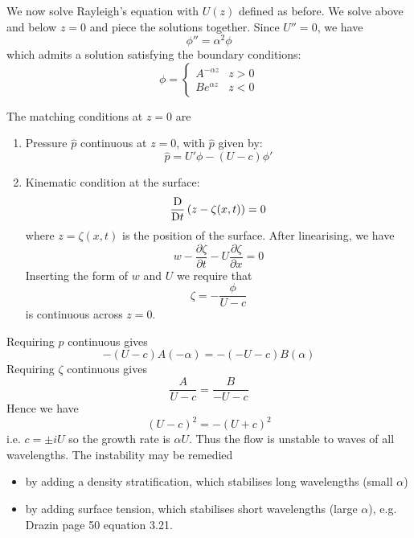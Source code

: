 \documentclass{jknotes}
\begin{document}
We now solve Rayleigh's equation with $U(z)$ defined as before. We solve above
and below $z=0$ and piece the solutions together. Since $U'' = 0$, we have
\begin{equation}
	\phi'' = \alpha^2 \phi
\end{equation}
which admits a solution satisfying the boundary conditions:
\begin{equation}
	\phi = \begin{cases} A^{-\alpha z} & z > 0 \\ B e^{\alpha z} & z < 0 
	\end{cases}
\end{equation}

The matching conditions at $z=0$ are
\begin{enumerate}
	\item Pressure $\hat{p}$ continuous at $z=0$, with $\hat{p}$ given by:
		\begin{equation}
			\hat{p} = U' \phi - (U-c) \phi'
		\end{equation}
	\item Kinematic condition at the surface:
		\begin{equation}
			\frac{\mathrm{D}}{\mathrm{D} t} \left( z - \zeta(x,t)\right) = 0
		\end{equation}
		where $z=\zeta(x,t)$ is the position of the surface.
		After linearising, we have
		\begin{equation}
			 w - \frac{\partial \zeta}{\partial t} - U\frac{\partial
			 \zeta}{\partial x} = 0
		\end{equation}
	 	Inserting the form of $w$ and $U$ we require that
	 	\begin{equation}
		 	\zeta = - \frac{\phi}{U-c}
	 	\end{equation}
	 	is continuous across $z=0$.
\end{enumerate}
Requiring $p$ continuous gives
\begin{equation}
	-(U-c)A(-\alpha) = - (-U-c)B(\alpha)
\end{equation}
Requiring $\zeta$ continuous gives
\begin{equation}
	\frac{A}{U-c} = \frac{B}{-U-c}
\end{equation}
Hence we have
\begin{equation}
	(U-c)^2 = -(U+c)^2
\end{equation}
i.e. $c = \pm i U$ so the growth rate is $\alpha U$. Thus the flow is unstable
to waves of all wavelengths. The instability may be remedied 
\begin{itemize}
	\item by adding a density stratification, which stabilises long
		wavelengths (small $\alpha$)
	\item by adding surface tension, which stabilises short wavelengths (large
		$\alpha$), e.g. Drazin page 50 equation 3.21.
\end{itemize}
\end{document}
